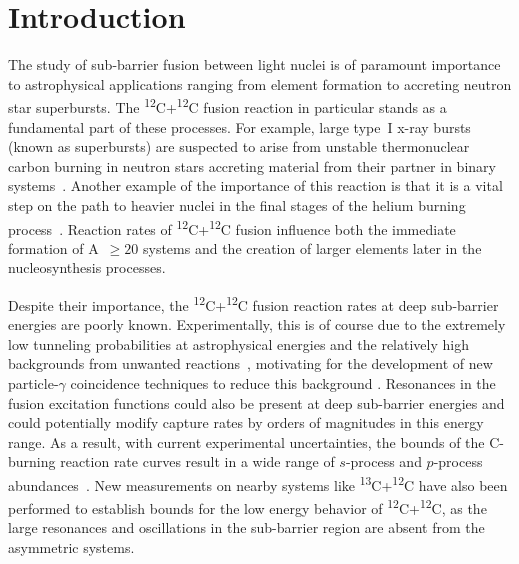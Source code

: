\section{Introduction}
\label{sec:intro}
The study of sub-barrier fusion between light nuclei is of paramount importance to astrophysical applications ranging from element formation to accreting neutron star superbursts.
The \textsuperscript{12}C+\textsuperscript{12}C fusion reaction in particular stands as a fundamental part of these processes.
For example, large type~I x-ray bursts (known as superbursts) are suspected to arise from unstable thermonuclear carbon burning in neutron stars accreting material from their partner in binary systems~\protect\cite{cumming2001,strohmayer2002}.
Another example of the importance of this reaction is that it is  a vital step on the path to heavier nuclei in the final stages of the helium burning process~\protect\cite{hoyle1954}.
Reaction rates of \textsuperscript{12}C+\textsuperscript{12}C fusion influence both the immediate formation of A~$\geq 20$ systems and the creation of larger elements later in the nucleosynthesis processes.

Despite their importance, the \textsuperscript{12}C+\textsuperscript{12}C fusion reaction rates at deep sub-barrier energies are poorly known. 
Experimentally, this is of course due to the extremely low tunneling probabilities at astrophysical energies 
and the relatively high backgrounds from unwanted reactions~\protect\cite{spillane2007,zickefoose2011}, 
motivating for the development of new particle-$\gamma$ coincidence techniques to reduce this background \protect\cite{courtin2017,jiang2018}. 
Resonances in the fusion excitation functions could also be present at deep sub-barrier energies \protect\cite{cooper2009,tumino2018} 
and could potentially modify capture rates by orders of magnitudes in this energy range. 
As a result, with current experimental uncertainties, 
the bounds of the C-burning reaction rate curves result in a wide range of $s$-process and $p$-process abundances~\protect\cite{pignatari2012}.
New measurements on nearby systems  like \textsuperscript{13}C+\textsuperscript{12}C \protect\cite{zhang2018}
have also been performed to establish bounds for the low energy behavior of \textsuperscript{12}C+\textsuperscript{12}C, 
as the large resonances and oscillations in the sub-barrier region are absent from the asymmetric systems. 

